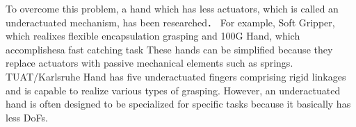 \documentclass{llncs}
\begin{document}

To overcome this problem, a hand which has less actuators,
which is called an underactuated mechanism, has been researched\cite{Birglen2008}．
For example, Soft Gripper, which realixes flexible encapsulation grasping\cite{Hirose1978}
and 100G Hand, which accomplishesa fast catching task\cite{Kaneko2003}
These hands can be simplified because they replace actuators with passive mechanical elements
such as springs.
TUAT/Karlsruhe Hand has five underactuated fingers comprising rigid linkages
and is capable to realize various types of grasping\cite{Fukaya2013}.
However, an underactuated hand is often designed to be specialized for specific tasks
because it basically has less DoFs.
\end{document}
